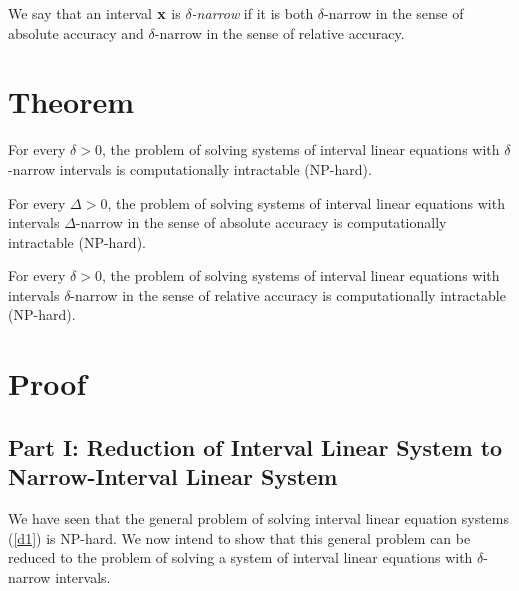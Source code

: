 \begin{definition}
{\rm We say that an interval ${\bf x}$ is {\em $\delta$-narrow\/} if it is
both $\delta$-narrow in the sense of absolute accuracy and $\delta$-narrow in
the sense of relative accuracy.}
\end{definition}

\section{Theorem}
\begin{theorem}
For every $\delta>0$, the problem of solving systems of interval linear
equations with $\delta$-narrow intervals is computationally intractable
(\/{\rm NP}-hard).
\end{theorem}

\begin{corollary}
For every $\Delta>0$, the problem of solving systems of interval linear
equations with intervals $\Delta$-narrow in the sense of absolute accuracy 
is computationally intractable (\/{\rm NP}-hard).
\end{corollary}

\begin{corollary}
For every $\delta>0$, the problem of solving systems of interval linear
equations with intervals $\delta$-narrow in the sense of relative accuracy is
computationally intractable (\/{\rm NP}-hard).
\end{corollary}

\newpage
\section{Proof}

\subsection{Part I: Reduction of Interval Linear System to Narrow-Interval
Linear System}

We have seen that the general problem of solving interval linear equation
systems (\ref{d1}) is NP-hard.  We now intend to show that this general
problem can be reduced to the problem of solving a system of 
interval linear equations with $\delta$-narrow intervals.

